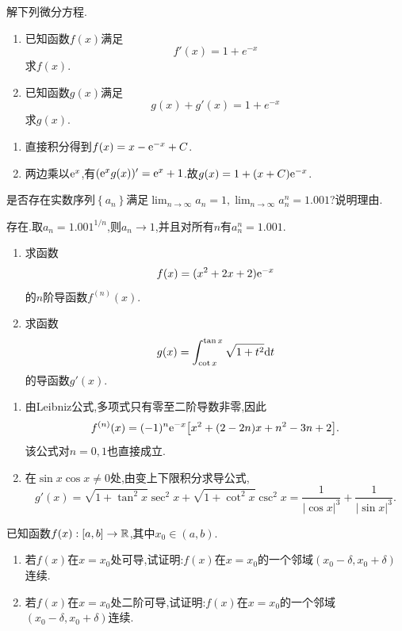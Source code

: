 \documentclass{ctexart}
\begin{document}
\begin{problem}[3.(10\songti{分})]
解下列微分方程.
        \begin{enumerate}[label=\textbf{(\arabic*)}]
            \item 已知函数$f(x)$满足$$f'(x)=1+e^{-x}$$求$f(x)$.
            \item 已知函数$g(x)$满足$$g(x)+g'(x)=1+e^{-x}$$求$g(x)$.
        \end{enumerate}
\end{problem}
\begin{solution}
\begin{enumerate}[label=\textbf{(\arabic*)}]
\item 直接积分得到$f(x)=x-\mathrm{e}^{-x}+C$.
\item 两边乘以$\mathrm{e}^x$,有$(\mathrm{e}^xg(x))'=\mathrm{e}^x+1$.故$g(x)=1+(x+C)\mathrm{e}^{-x}$.
\end{enumerate}
\end{solution}
\begin{problem}[4.(10\songti{分})]
是否存在实数序列$\left\{a_n\right\}$满足$\displaystyle\lim_{n\to\infty}a_n=1,\lim_{n\to\infty}a_n^n=1.001$?说明理由.
\end{problem}
\begin{solution}
存在.取$a_n=1.001^{1/n}$,则$a_n\to1$,并且对所有$n$有$a_n^n=1.001$.
\end{solution}
\begin{problem}[5.(10\songti{分})]
\begin{enumerate}[label=\textbf{(\arabic*)}]
            \item 求函数$$f(x)=(x^2+2x+2)\mathrm{e}^{-x}$$的$n$阶导函数$f^{(n)}(x)$.
            \item 求函数$$g(x)=\int_{\cot x}^{\tan x}\sqrt{1+t^2}\mathrm{d} t$$的导函数$g'(x)$.
        \end{enumerate}
\end{problem}
\begin{solution}
\begin{enumerate}[label=\textbf{(\arabic*)}]
\item 由Leibniz公式,多项式只有零至二阶导数非零,因此
\[f^{(n)}(x)=(-1)^n\mathrm{e}^{-x}\bigl[x^2+(2-2n)x+n^2-3n+2\bigr].\]
该公式对$n=0,1$也直接成立.
\item 在$\sin x\cos x\neq0$处,由变上下限积分求导公式,
\[g'(x)=\sqrt{1+\tan^2x}\sec^2x+\sqrt{1+\cot^2x}\csc^2x
=\dfrac1{|\cos x|^3}+\dfrac1{|\sin x|^3}.\]
\end{enumerate}
\end{solution}
\begin{problem}[6.(10\songti{分})]
已知函数$f(x):[a,b]\to\mathbb{R}$,其中$x_0\in(a,b)$.
        \begin{enumerate}[label=\textbf{(\arabic*)}]
            \item 若$f(x)$在$x=x_0$处可导,试证明:$f(x)$在$x=x_0$的一个邻域$(x_0-\delta,x_0+\delta)$连续.
            \item 若$f(x)$在$x=x_0$处二阶可导,试证明:$f(x)$在$x=x_0$的一个邻域$(x_0-\delta,x_0+\delta)$连续.
        \end{enumerate}
\end{problem}
\end{document}
